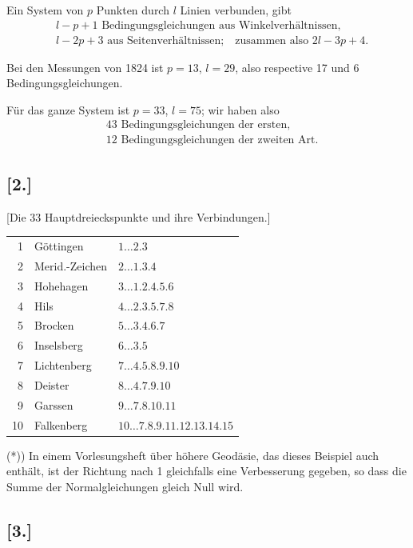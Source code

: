 \documentclass[12pt,a4paper]{article}
\theoremstyle{plain}
\theoremstyle{definition}
\theoremstyle{remark}
\begin{document}
Ein System von $p$ Punkten durch $l$ Linien verbunden, gibt
\begin{align*}
&\text{$l - p + 1$ Bedingungsgleichungen aus Winkelverh\"altnissen,}\\
&\text{$l - 2p + 3$ aus Seitenverh\"altnissen;} \quad \text{zusammen also $2l - 3p + 4$.}
\end{align*}

Bei den Messungen von 1824 ist $p = 13$, $l = 29$, also respective 17 und 6 Bedingungsgleichungen.

F\"ur das ganze System ist $p = 33$, $l = 75$; wir haben also
\begin{align*}
&\text{43 Bedingungsgleichungen der ersten,}\\
&\text{12 Bedingungsgleichungen der zweiten Art.}
\end{align*}

\subsection*{[2.]}
\label{subsec:netz2}

[Die 33 Hauptdreieckspunkte und ihre Verbindungen.]

\begin{center}
\begin{tabular}{r|l|l}
1 & G\"ottingen & $1 \ldots 2.3$\\
2 & Merid.-Zeichen & $2 \ldots 1.3.4$\\
3 & Hohehagen & $3 \ldots 1.2.4.5.6$\\
4 & Hils & $4 \ldots 2.3.5.7.8$\\
5 & Brocken & $5 \ldots 3.4.6.7$\\
6 & Inselsberg & $6 \ldots 3.5$\\
7 & Lichtenberg & $7 \ldots 4.5.8.9.10$\\
8 & Deister & $8 \ldots 4.7.9.10$\\
9 & Garssen & $9 \ldots 7.8.10.11$\\
10 & Falkenberg & $10 \ldots 7.8.9.11.12.13.14.15$
\end{tabular}
\end{center}

(*)) In einem Vorlesungsheft \"uber h\"ohere Geod\"asie, das dieses Beispiel auch enth\"alt, ist der Richtung nach 1 gleichfalls eine Verbesserung gegeben, so dass die Summe der Normalgleichungen gleich Null wird.

\newpage
\subsection*{[3.]}
\label{subsec:netz3}
\end{document}
